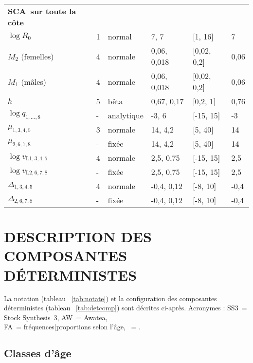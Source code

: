 \documentclass[11pt]{book}
\begin{document}
\begin{longtable}{L{1.6in}C{1.0in}C{1.0in}C{1.0in}C{1.0in}C{0.8in}}
\textbf{SCA~sur toute la c\^{o}te} &   &          &              &             &\\
$\log R_0$                    & 1 & normal   & 7, 7         & [1, 16]     &  7\\
$M_{2}$ (femelles)              & 4 & normale   & 0,06, 0,018  & [0,02, 0,2] &  0,06\\
$M_{1}$ (m\^{a}les)                & 4 & normale   & 0,06, 0,018  & [0,02, 0,2] &  0,06\\
$h$                           & 5 & b\^{e}ta     & 0,67, 0,17   & [0,2, 1]    &  0,76\\
$\log q_{1,...,8}$            & - & analytique & -3,   6      & [-15, 15]   & -3\\
$\mu_{1,3,4,5}$               & 3 & normale   & 14, 4,2      & [5, 40]     & 14\\
$\mu_{2,6,7,8}$               & - & fix\'{e}e    & 14, 4,2      & [5, 40]     & 14\\
$\log v_{\text{L}1,3,4,5}$    & 4 & normale   & 2,5, 0,75    & [-15, 15]   & 2,5\\
$\log v_{\text{L}2,6,7,8}$    & - & fix\'{e}e    & 2,5, 0,75    & [-15, 15]   & 2,5\\
$\Delta_{1,3,4,5}$            & 4 & normale   & -0,4, 0,12   & [-8, 10]    & -0,4\\
$\Delta_{2,6,7,8}$            & - & fix\'{e}e    & -0,4, 0,12   & [-8, 10]    & -0,4\\
\hline  
\end{longtable}


\section{DESCRIPTION DES COMPOSANTES D\'{E}TERMINISTES}

La notation (tableau ~\ref{tab:notate}) et la configuration des composantes d\'{e}terministes (tableau ~\ref{tab:detcomp}) sont d\'{e}crites ci-apr\`{e}s. Acronymes : SS3~= Stock Synthesis~3, AW~= Awatea,\\
FA~= fr\'{e}quences|proportions selon l'\^{a}ge, \spc~= \spn.


\subsection{Classes d'\^{a}ge}
\end{document}
